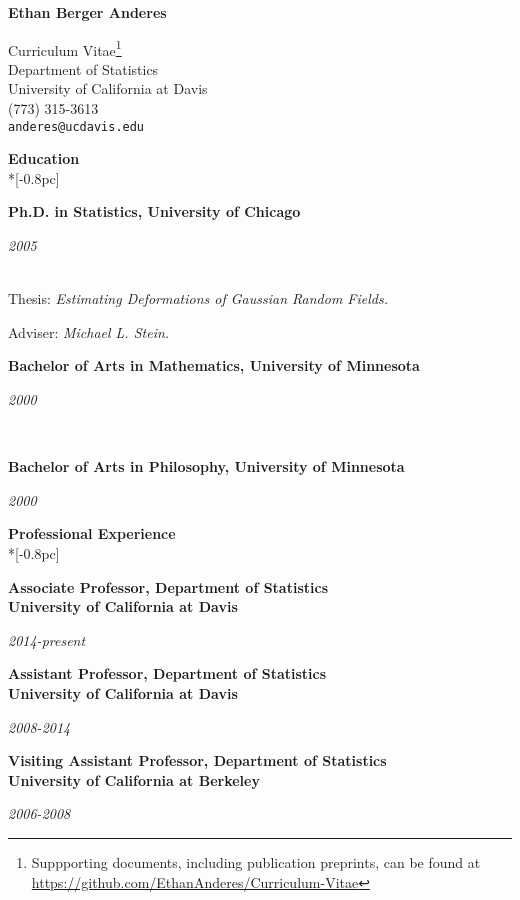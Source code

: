 \documentclass[11pt]{article}
\newcommand{\head}[1]{
  \vspace{10pt}
  {\Large \bf #1} \\*[-0.8pc]
  \underline{\hspace{6.07in}}}
\newcommand{\datedentry}[2]{
  \vspace{5pt}
  \begin{minipage}{5in}{\textbf{#1}}\end{minipage}
  \hfill
  \begin{minipage}{1in}{\hfill\textit{#2}}\end{minipage}
  }
\begin{document}
\begin{center}
  \begin{Large}
    \textbf{Ethan Berger Anderes} \\ \vspace{5pt}
  \end{Large}
  Curriculum Vitae\footnote{Suppporting documents, including publication preprints, can be found at \url{https://github.com/EthanAnderes/Curriculum-Vitae}}\\
  Department of Statistics\\
  University of California at Davis\\
  (773) 315-3613\\
  \texttt{anderes@ucdavis.edu}
\end{center}

\flushleft
\head{Education}%


\datedentry{Ph.D. in Statistics, University of Chicago}{ 2005}\\
\vspace{5pt}
Thesis: %
{\sl Estimating Deformations of Gaussian Random Fields.}

Adviser: {\sl Michael L. Stein.}

\vspace{2pt}

\datedentry{Bachelor of Arts in Mathematics, University of Minnesota }{2000}\\
\vspace{4pt}
\datedentry{Bachelor of Arts in Philosophy, University of Minnesota }{2000}

\head{Professional Experience}%


\datedentry{Associate Professor, Department of Statistics\\
University of California at Davis}{2014-present}

\vspace{7pt}


\datedentry{Assistant Professor, Department of Statistics\\
University of California at Davis}{2008-2014}

\vspace{7pt}

\datedentry{Visiting Assistant Professor, Department of Statistics\\
University of California at Berkeley}{2006-2008}
\end{document}

